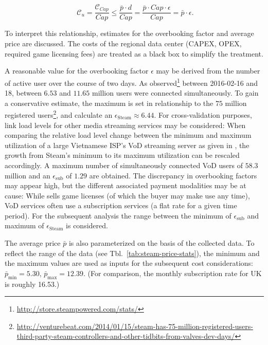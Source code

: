 \begin{equation}
  \phantom{\text{.}}\mathcal{C}_u = \frac{\mathcal{C}_{Cap}}{Cap} \leq \frac{\bar{p} \cdot d}{Cap} = \frac{\bar{p} \cdot Cap \cdot \epsilon}{Cap} = \bar{p} \cdot \epsilon\text{.}
\end{equation}

To interpret this relationship, estimates for the overbooking factor and average price are discussed. The costs of the regional data center (\gls{CAPEX}, \gls{OPEX}, required game licensing fees) are treated as a black box to simplify the treatment.

A reasonable value for the overbooking factor $\epsilon$ may be derived from the number of active \steam user over the course of two days. As observed\footnote{\url{http://store.steampowered.com/stats/}} between 2016-02-16 and 18, between $6.53$ and $11.65$ million users were connected simultaneously. To gain a conservative estimate, the maximum is set in relationship to the $75$ million registered \steam users\footnote{\url{http://venturebeat.com/2014/01/15/steam-has-75-million-registered-users-third-party-steam-controllers-and-other-tidbits-from-valves-dev-days/}}, and calculate an $\epsilon_{\text{Steam}}\approx6.44$. For cross-validation purposes, link load levels for other media streaming services may be considered: When comparing the relative load level change between the minimum and maximum utilization of a large Vietnamese \acrshort{ISP}'s \gls{VoD} streaming server as given in \cite{thanh2012enabling}, the growth from Steam's minimum to its maximum utilization can be rescaled accordingly. A maximum number of simultaneously connected \gls{VoD} users of $58.3$ million and an $\epsilon_{\text{sub}}$ of $1.29$ are obtained. The discrepancy in overbooking factors may appear high, but the different associated payment modalities may be at cause: While \steam sells game licenses (of which the buyer may make use any time), \gls{VoD} services often use a subscription services (a flat rate for a given time period). For the subsequent analysis the range between the minimum of $\epsilon_{\text{sub}}$ and maximum of $\epsilon_{\text{Steam}}$ is considered.

The average price $\bar{p}$ is also parameterized on the basis of the collected \steam data. To reflect the range of the data (see Tbl.~\ref{tab:steam-price-stats}), the minimum and the maximum values are used as inputs for the subsequent cost considerations: $\bar{p}_{\text{min}} = 5.30$, $\bar{p}_{\text{max}} = 12.39$. (For comparison, the monthly subscription rate for \psnow UK is roughly \SI{16.53}[\EUR]{}.)


